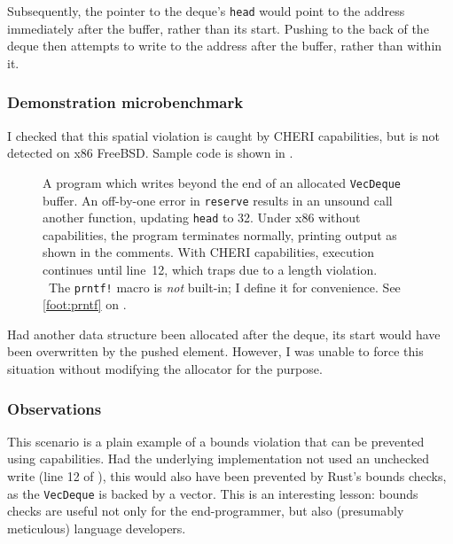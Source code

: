 \documentclass[dissertation.tex]{subfiles}
\begin{document}
Subsequently, the pointer to the deque's \texttt{head} would point to
the address immediately after the buffer, rather than its start.
Pushing to the back of the deque then attempts to write to the address
after the buffer, rather than within it.

\subsubsection{Demonstration microbenchmark}
I checked that this spatial violation is caught by CHERI capabilities,
but is not detected on x86 FreeBSD.
Sample code is shown in .

\begin{figure}[ht]
    
    \caption{
        A program which writes beyond the end of an allocated
        \texttt{VecDeque} buffer.
        An off-by-one error in \texttt{reserve} results in an unsound
        call another function, updating \texttt{head} to 32.
        Under x86 without capabilities, the program terminates normally,
        printing output as shown in the
        comments.{\protect\textsuperscript\textdagger}
        With CHERI capabilities, execution continues until line~12, which
        traps due to a length violation.
        \\ {\footnotesize \protect\textdagger\ The \texttt{prntf!} macro
        is \emph{not} built-in; I define it for convenience. See
        \cref{foot:prntf} on .}
    }
    \label{lst:micro-capacity}
\end{figure}

Had another data structure been allocated after the deque, its start
would have been overwritten by the pushed element.
However, I was unable to force this situation without modifying the
allocator for the purpose.

\subsubsection{Observations}
This scenario is a plain example of a bounds violation that can be
prevented using capabilities.
Had the underlying implementation not used an unchecked write (line 12
of ), this would also have been prevented by Rust's
bounds checks, as the \texttt{VecDeque} is backed by a vector.
This is an interesting lesson: bounds checks are useful not only for the
end-programmer, but also (presumably meticulous) language developers.
\end{document}

